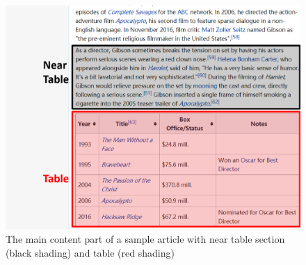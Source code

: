 \begin{figure}[t]
\centering
\includegraphics[width=0.8\columnwidth]{vis_example3}
\caption{The main content part of a sample article with near table section (black shading) and table (red shading)}
\label{vis_example3}
\end{figure}